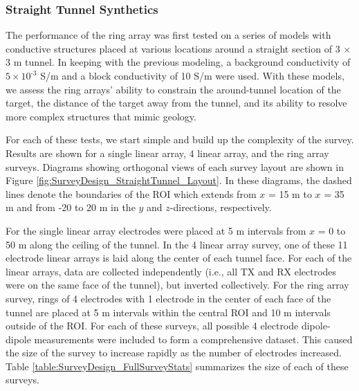 \documentclass[preprint,authoryear,12pt]{elsarticle}
\begin{document}
\subsubsection{Straight Tunnel Synthetics}
\label{sec:RingArray_Development_Straight_Synth_Intro}
The performance of the ring array was first tested on a series of models with conductive structures placed at various locations around a straight section of 3 $\times$ 3 m tunnel. In keeping with the previous modeling, a background conductivity of $5 \times 10^{\text{-3}}$ S/m and a block conductivity of 10 S/m were used. With these models, we assess the ring arrays' ability to constrain the around-tunnel location of the target, the distance of the target away from the tunnel, and its ability to resolve more complex structures that mimic geology.

For each of these tests, we start simple and build up the complexity of the survey. Results are shown for a single linear array, 4 linear array, and the ring array surveys. Diagrams showing orthogonal views of each survey layout are shown in Figure \ref{fig:SurveyDesign_StraightTunnel_Layout}. In these diagrams, the dashed lines denote the boundaries of the ROI which extends from $x$ = 15 m to $x$ = 35 m and from -20 to 20 m in the $y$ and $z$-directions, respectively.

For the single linear array electrodes were placed at 5 m intervals from $x$ = 0 to 50 m along the ceiling of the tunnel. In the 4 linear array survey, one of these 11 electrode linear arrays is laid along the center of each tunnel face. For each of the linear arrays, data are collected independently (i.e., all TX and RX electrodes were on the same face of the tunnel), but inverted collectively. For the ring array survey, rings of 4 electrodes with 1 electrode in the center of each face of the tunnel are placed at 5 m intervals within the central ROI and 10 m intervals outside of the ROI. For each of these surveys, all possible 4 electrode dipole-dipole measurements were included to form a comprehensive dataset. This caused the size of the survey to increase rapidly as the number of electrodes increased. Table \ref{table:SurveyDesign_FullSurveyStats} summarizes the size of each of these surveys.
\end{document}
